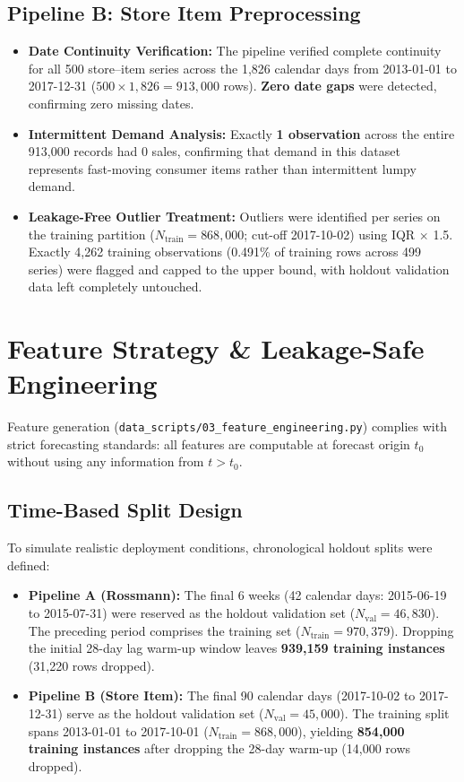 \documentclass[11pt,a4paper]{article}
\begin{document}
\subsection{Pipeline B: Store Item Preprocessing}
\begin{itemize}
    \item \textbf{Date Continuity Verification:} The pipeline verified complete continuity for all 500 store--item series across the 1,826 calendar days from 2013-01-01 to 2017-12-31 ($500 \times 1,826 = 913,000$ rows). \textbf{Zero date gaps} were detected, confirming zero missing dates.
    \item \textbf{Intermittent Demand Analysis:} Exactly \textbf{1 observation} across the entire 913,000 records had 0 sales, confirming that demand in this dataset represents fast-moving consumer items rather than intermittent lumpy demand.
    \item \textbf{Leakage-Free Outlier Treatment:} Outliers were identified per series on the training partition ($N_{\text{train}} = 868,000$; cut-off 2017-10-02) using IQR $\times$ 1.5. Exactly 4,262 training observations (0.491\% of training rows across 499 series) were flagged and capped to the upper bound, with holdout validation data left completely untouched.
\end{itemize}

\FloatBarrier

\section{Feature Strategy \& Leakage-Safe Engineering}

Feature generation (\texttt{data\_scripts/03\_feature\_engineering.py}) complies with strict forecasting standards: all features are computable at forecast origin $t_0$ without using any information from $t > t_0$.

\subsection{Time-Based Split Design}
To simulate realistic deployment conditions, chronological holdout splits were defined:
\begin{itemize}
    \item \textbf{Pipeline A (Rossmann):} The final 6 weeks (42 calendar days: 2015-06-19 to 2015-07-31) were reserved as the holdout validation set ($N_{\text{val}} = 46,830$). The preceding period comprises the training set ($N_{\text{train}} = 970,379$). Dropping the initial 28-day lag warm-up window leaves \textbf{939,159 training instances} (31,220 rows dropped).
    \item \textbf{Pipeline B (Store Item):} The final 90 calendar days (2017-10-02 to 2017-12-31) serve as the holdout validation set ($N_{\text{val}} = 45,000$). The training split spans 2013-01-01 to 2017-10-01 ($N_{\text{train}} = 868,000$), yielding \textbf{854,000 training instances} after dropping the 28-day warm-up (14,000 rows dropped).
\end{itemize}
\end{document}
